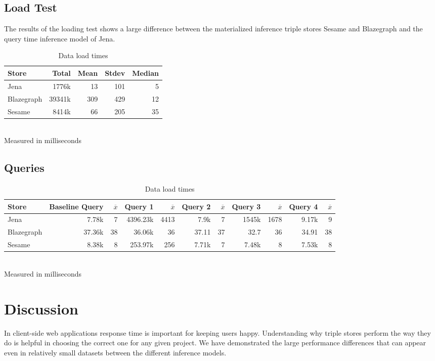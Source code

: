 \documentclass{llncs}
\begin{document}
\subsection{Load Test}
The results of the loading test shows a large difference between the materialized inference triple stores Sesame and Blazegraph and the query time inference model of Jena.

\begin{table}
\begin{center}
\caption{Data load times}
\begin{tabular}{l | r r r r }
Store & Total & Mean & Stdev & Median \\
\hline
Jena & 1776k & 13 & 101 & 5 \\
Blazegraph & 39341k & 309 & 429 & 12 \\
Sesame & 8414k & 66 & 205 & 35
\end{tabular}
\\[5pt]
Measured in milliseconds
\end{center}
\end{table}

\subsection{Queries}
\begin{table}
\begin{center}
\caption{Data load times}
\begin{tabular}{l | r r r r r r r r r r}
Store & Baseline Query & $\overline{x}$ & Query 1 & $\overline{x}$ & Query 2 & $\overline{x}$ & Query 3 & $\overline{x}$ & Query 4 & $\overline{x}$ \\
\hline
Jena & 7.78k & 7 & 4396.23k & 4413 & 7.9k & 7 & 1545k & 1678 & 9.17k & 9 \\
Blazegraph & 37.36k & 38 & 36.06k & 36 & 37.11 & 37 & 32.7 & 36 & 34.91 & 38\\
Sesame & 8.38k & 8 & 253.97k & 256 & 7.71k & 7 & 7.48k & 8 & 7.53k & 8
\end{tabular}
\\[5pt]
Measured in milliseconds
\end{center}
\end{table}

\section{Discussion}
In client-side web applications response time is important for keeping users happy.  Understanding why triple stores perform the way they do is helpful in choosing the correct one for any given project.  We have demonstrated the large performance differences that can appear even in relatively small datasets between the different inference models.



\end{document}
